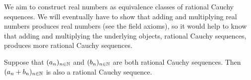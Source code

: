 We aim to construct real numbers as equivalence classes of rational Cauchy sequences.
We will eventually have to show that adding and multiplying real numbers produces real numbers (see the field axioms), so it would help to know that adding and multiplying the underlying objects, rational Cauchy sequences, produces more rational Cauchy sequences.

\begin{prop} \label{prop:RationalCauchyClosedUnderSum}
	Suppose that $(a_n)_{n\in\mathbb N}$ and $(b_n)_{n\in\mathbb N}$ are both rational Cauchy sequences.
	Then $(a_n+b_n)_{n\in\mathbb N}$ is also a rational Cauchy sequence.
\end{prop}

